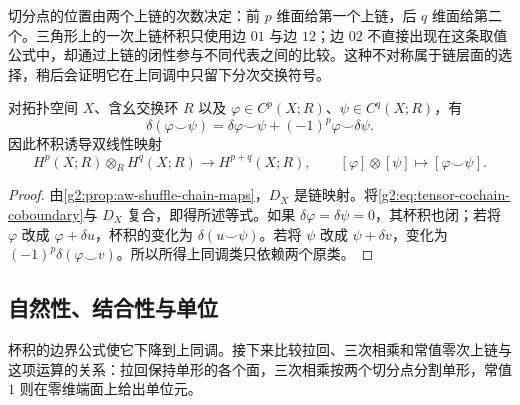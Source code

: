 切分点的位置由两个上链的次数决定：前 \(p\) 维面给第一个上链，后 \(q\) 维面给第二个。三角形上的一次上链杯积只使用边 \(01\) 与边 \(12\)；边 \(02\) 不直接出现在这条取值公式中，却通过上链的闭性参与不同代表之间的比较。这种不对称属于链层面的选择，稍后会证明它在上同调中只留下分次交换符号。

\begin{proposition}\label{g2:prop:cup-leibniz}
	对拓扑空间 \(X\)、含幺交换环 \(R\) 以及 \(\varphi\in C^p(X;R)\)、\(\psi\in C^q(X;R)\)，有
	\[
		\delta(\varphi\smile\psi)
		=\delta\varphi\smile\psi+(-1)^p\varphi\smile\delta\psi.
	\]
	因此杯积诱导双线性映射
	\[
		H^p(X;R)\otimes_R H^q(X;R)\longrightarrow H^{p+q}(X;R),
		\qquad
		[\varphi]\otimes[\psi]\longmapsto[\varphi\smile\psi].
	\]
\end{proposition}
\begin{proof}
	由\cref{g2:prop:aw-shuffle-chain-maps}，\(D_X\) 是链映射。将\eqref{g2:eq:tensor-cochain-coboundary}与 \(D_X\) 复合，即得所述等式。如果 \(\delta\varphi=\delta\psi=0\)，其杯积也闭；若将 \(\varphi\) 改成 \(\varphi+\delta u\)，杯积的变化为 \(\delta(u\smile\psi)\)。若将 \(\psi\) 改成 \(\psi+\delta v\)，变化为 \((-1)^p\delta(\varphi\smile v)\)。所以所得上同调类只依赖两个原类。
\end{proof}

\subsection{自然性、结合性与单位}
\label{g2:subsec:0404:02}

杯积的边界公式使它下降到上同调。接下来比较拉回、三次相乘和常值零次上链与这项运算的关系：拉回保持单形的各个面，三次相乘按两个切分点分割单形，常值 \(1\) 则在零维端面上给出单位元。

